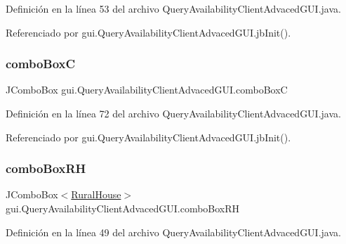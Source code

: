 Definición en la línea 53 del archivo Query\+Availability\+Client\+Advaced\+G\+U\+I.\+java.



Referenciado por gui.\+Query\+Availability\+Client\+Advaced\+G\+U\+I.\+jb\+Init().

\mbox{\label{classgui_1_1_query_availability_client_advaced_g_u_i_a65f09bcf200b7c759a0aba2c6d111f50}} 
\subsubsection{\texorpdfstring{comboBoxC}{comboBoxC}}
{\footnotesize\ttfamily J\+Combo\+Box gui.\+Query\+Availability\+Client\+Advaced\+G\+U\+I.\+combo\+BoxC\hspace{0.3cm}{\ttfamily [private]}}



Definición en la línea 72 del archivo Query\+Availability\+Client\+Advaced\+G\+U\+I.\+java.



Referenciado por gui.\+Query\+Availability\+Client\+Advaced\+G\+U\+I.\+jb\+Init().

\mbox{\label{classgui_1_1_query_availability_client_advaced_g_u_i_aadf6bbbf39771a8fe4131b2c04dbfb28}} 
\subsubsection{\texorpdfstring{comboBoxRH}{comboBoxRH}}
{\footnotesize\ttfamily J\+Combo\+Box$<$\mbox{\hyperlink{classdomain_1_1_rural_house}{Rural\+House}}$>$ gui.\+Query\+Availability\+Client\+Advaced\+G\+U\+I.\+combo\+Box\+RH\hspace{0.3cm}{\ttfamily [private]}}



Definición en la línea 49 del archivo Query\+Availability\+Client\+Advaced\+G\+U\+I.\+java.



